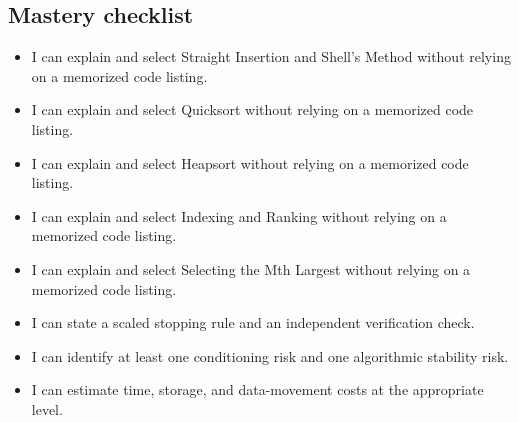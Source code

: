 \documentclass[10pt,letterpaper]{article}
\begin{document}
\subsection*{Mastery checklist}
\begin{itemize}
\item[$\square$] I can explain and select Straight Insertion and Shell's Method without relying on a memorized code listing.
\item[$\square$] I can explain and select Quicksort without relying on a memorized code listing.
\item[$\square$] I can explain and select Heapsort without relying on a memorized code listing.
\item[$\square$] I can explain and select Indexing and Ranking without relying on a memorized code listing.
\item[$\square$] I can explain and select Selecting the Mth Largest without relying on a memorized code listing.
\item[$\square$] I can state a scaled stopping rule and an independent verification check.
\item[$\square$] I can identify at least one conditioning risk and one algorithmic stability risk.
\item[$\square$] I can estimate time, storage, and data-movement costs at the appropriate level.
\end{itemize}
\end{document}
